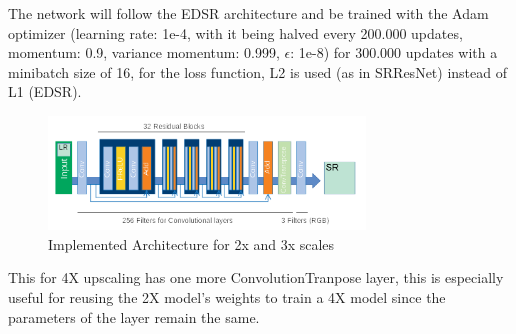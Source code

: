 \hfill

The network will follow the EDSR architecture and be trained with the Adam optimizer (learning rate: 1e-4, with it being halved every 200.000 updates, momentum: 0.9, variance momentum: 0.999, $\epsilon$: 1e-8) for 300.000 updates with a minibatch size of 16, for the loss function, L2 is used (as in SRResNet) instead of L1 (EDSR).

\begin{figure}[H]
\centering
\includegraphics[width=0.75\textwidth]{../Figures/EDSR_Arch}
\caption{Implemented Architecture for 2x and 3x scales}
\end{figure}

\hfill

This for 4X upscaling has one more ConvolutionTranpose layer, this is especially useful for reusing the 2X model's weights to train a 4X model since the parameters of the layer remain the same.
